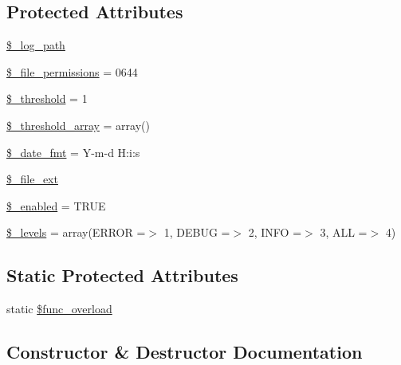 \subsection*{Protected Attributes}
\begin{DoxyCompactItemize}
\item 
\mbox{\hyperlink{class_c_i___log_a3eaf9e92941ee6be33bc972ab76b4caf}{\$\+\_\+log\+\_\+path}}
\item 
\mbox{\hyperlink{class_c_i___log_a8a805f532669024e8868a5cca0d6f97b}{\$\+\_\+file\+\_\+permissions}} = 0644
\item 
\mbox{\hyperlink{class_c_i___log_a0fc9914bdaf300fa9a1745201204e73f}{\$\+\_\+threshold}} = 1
\item 
\mbox{\hyperlink{class_c_i___log_a95562d965f341c55d2c997ed12b4b721}{\$\+\_\+threshold\+\_\+array}} = array()
\item 
\mbox{\hyperlink{class_c_i___log_aab5c1870169c8e04ede18245f04ad85c}{\$\+\_\+date\+\_\+fmt}} = \textquotesingle{}Y-\/m-\/d H\+:i\+:s\textquotesingle{}
\item 
\mbox{\hyperlink{class_c_i___log_ad0c7fa3db6c5e41616bbdf4719492518}{\$\+\_\+file\+\_\+ext}}
\item 
\mbox{\hyperlink{class_c_i___log_af8233d47e8ad3e624ba168154d2f383d}{\$\+\_\+enabled}} = T\+R\+UE
\item 
\mbox{\hyperlink{class_c_i___log_aeb1c4747136537731b6cfed6f1e64941}{\$\+\_\+levels}} = array(\textquotesingle{}E\+R\+R\+OR\textquotesingle{} =$>$ 1, \textquotesingle{}D\+E\+B\+UG\textquotesingle{} =$>$ 2, \textquotesingle{}I\+N\+FO\textquotesingle{} =$>$ 3, \textquotesingle{}A\+LL\textquotesingle{} =$>$ 4)
\end{DoxyCompactItemize}
\subsection*{Static Protected Attributes}
\begin{DoxyCompactItemize}
\item 
static \mbox{\hyperlink{class_c_i___log_aef84be58d58a5895572c5689e56a1047}{\$func\+\_\+overload}}
\end{DoxyCompactItemize}


\subsection{Constructor \& Destructor Documentation}
\mbox{\label{class_c_i___log_a095c5d389db211932136b53f25f39685}} 
